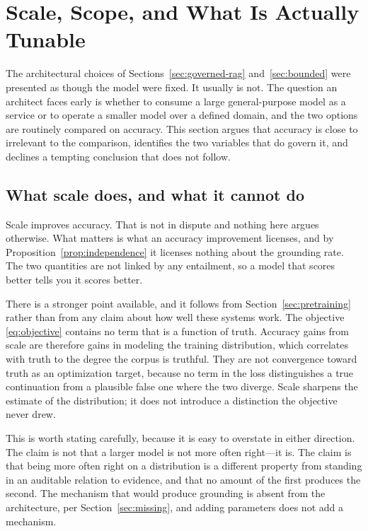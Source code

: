 \chapter{Scale, Scope, and What Is Actually Tunable}
\label{ch:scale-and-scope}
\label{sec:scale}

The architectural choices of Sections~\ref{sec:governed-rag} and~\ref{sec:bounded}
were presented as though the model were fixed. It usually is not. The question an
architect faces early is whether to consume a large general-purpose model as a
service or to operate a smaller model over a defined domain, and the two options are
routinely compared on accuracy. This section argues that accuracy is close to
irrelevant to the comparison, identifies the two variables that do govern it, and
declines a tempting conclusion that does not follow.

\section{What scale does, and what it cannot do}

Scale improves accuracy. That is not in dispute and nothing here argues otherwise.
What matters is what an accuracy improvement licenses, and by
Proposition~\ref{prop:independence} it licenses nothing about the grounding rate. The
two quantities are not linked by any entailment, so a model that
scores better tells you it scores better.

There is a stronger point available, and it follows from
Section~\ref{sec:pretraining} rather than from any claim about how well these systems
work. The objective \eqref{eq:objective} contains no term that is a function of
truth. Accuracy gains from scale are therefore gains in modeling the training
distribution, which correlates with truth to the degree the corpus is truthful. They
are not convergence toward truth as an optimization target, because no term in the
loss distinguishes a true continuation from a plausible false one where the two
diverge. Scale sharpens the estimate of the distribution; it does not introduce a
distinction the objective never drew.

This is worth stating carefully, because it is easy to overstate in either
direction. The claim is not that a larger model is not more often right---it is. The
claim is that being more often right on a distribution is a different property from
standing in an auditable relation to evidence, and that no amount of the first
produces the second. The mechanism that would produce grounding is absent from the
architecture, per Section~\ref{sec:missing}, and adding parameters does not add a
mechanism.

